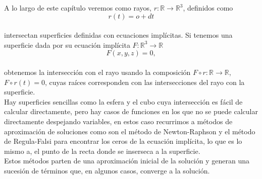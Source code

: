 A lo largo de este capítulo veremos como rayos, $ r : \mathbb{R} \to \mathbb{R}^3$, definidos como
${ }$\\
$$ r(t) = o + dt $$
${ }$\\
intersectan superficies definidas con ecuaciones implícitas. Si tenemos una superficie dada por su ecuación implícita $ F : \mathbb{R}^3 \to \mathbb{R} $
${ }$\\
$$ F(x,y,z) = 0, $$
${ }$\\
obtenemos la intersección con el rayo usando la composición $F \circ r : \mathbb{R} \to \mathbb{R}$, $F \circ r (t) = 0$, cuyas raíces corresponden con las intersecciones del rayo con la superficie.
${ }$\\

Hay superficies sencillas como la esfera y el cubo cuya intersección es fácil de calcular directamente, pero hay casos de funciones en los que no se puede calcular directamente despejando variables, en estos caso recurrimos a métodos de aproximación de soluciones como son el método de Newton-Raphson y el método de Regula-Falsi para encontrar los ceros de la ecuación implícita, lo que es lo mismo a, el punto de la recta donde se inserseca a la superficie.
${ }$\\

Estos métodos parten de una aproximación inicial de la solución y generan una sucesión de términos que, en algunos casos, converge a la solución.